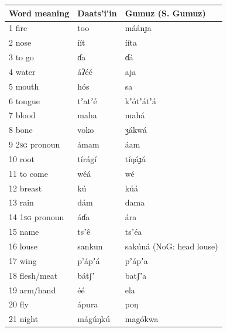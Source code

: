 \documentclass[output=paper]{langsci/langscibook}
\begin{document}
\begin{longtable}{p{}  p{} p{}}
\lsptoprule
Word meaning & Daats’i\'{ }in & Gumuz (S. Gumuz)\\
\midrule
1 fire & too & m\'{a}\'{a}nɟa \\

2 nose & \'{i}\'{i}t & \'{i}\'{i}ta \\

3 to go & ɗa & ɗ\'{a} \\

4 water & \'{a}ʔ\'{e}\'{e} & aja \\

5 mouth & h\'{o}s & sa \\

6 tongue & tʼatʼ\'{e} & kʼ\'{o}tʼ\'{a}tʼ\'{a} \\

7 blood & maha & mah\'{a} \\

8 bone & voko & ʒ\'{a}kw\'{a} \\

9 2\textsc{sg} pronoun & \'{a}mam & \'{a}am \\

10 root & t\'{i}r\'{a}g\'{i} & t\'{i}ŋ\'{a}ɟ\'{a} \\

11 to come & w\'{e}\'{a} & w\'{e} \\

12 breast & k\'{u} & k\'{u}\'{a} \\

13 rain & d\'{a}m & dama \\

14 1\textsc{sg} pronoun & \'{a}ɗa & \'{a}ra \\

15 name & tsʼ\^{e} & tsʼ\'{e}a \\

16 louse & sankun & sak\'{u}n\'{a} (NoG: head louse) \\

17 wing & p’\'{a}pʼ\'{a} & pʼ\'{a}pʼa \\

18 flesh/meat & b\'{a}tʃʼ & batʃʼa \\

19 arm/hand & \'{e}\'{e} & ela \\

20 fly & \'{a}pura & poŋ \\

21 night & m\'{a}g\'{u}ŋk\'{u} & mag\'{o}kwa \\


\end{longtable}
\end{document}
